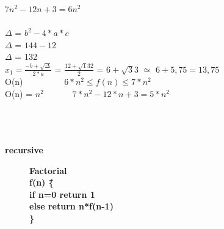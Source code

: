 \documentclass{article}
\begin{document}
{   \hspace{40}$7n^2-12n+3=6n^2$ \hspace{60}  \\
   
   
   
  \\
  
  

$\Delta$ = $b^2 - 4 * a*c$ \\

$\Delta$ = $144-12$ \\ 

$\Delta$ = 132 \\

$x{_1} = \frac{-b+\sqrt\Delta}{2*a}$  = $\frac{12 + \sqrt 132}{2}$ = $6 + \sqrt 33$ $\simeq$ $6 + 5,75 = 13,75$ \\ 

O(n) \ \ \ \ \  \ \ \ \ $6*n^2 \leq f(n) \leq 7*n^2 $ \\ 
O(n) = $n^2$ \ \ \ \ \ \ $7*n^2 - 12*n + 3 = 5*n^2$ \\
\indent \hspace{1.9cm}{$2*n^2-12*n+3=0$} \\
\indent \hspace{1.9cm}{$\Delta$ $= 144-24 =  120$} \\
\indent {} \\ 


\pagebreak

{\bf recursive}

\begin{figure}[ht]
\begin{center}
\begin{tabbing}

\indent \bf Factorial \\
\indent f(n) \=\{ \\
\indent \> if n=0 return 1 \hspace{1cm}{\it O(1)}\\
\indent \> else return n*f(n-1) \\
\indent \} \\
\end{tabbing}
\label{fig_alg_ex}
\end{center}
\end{figure}

\begin{figure}[ht]
\begin{center}
\begin{tabbing}


\end{tabbing}
\end{center}
\end{figure}}
\end{document}

